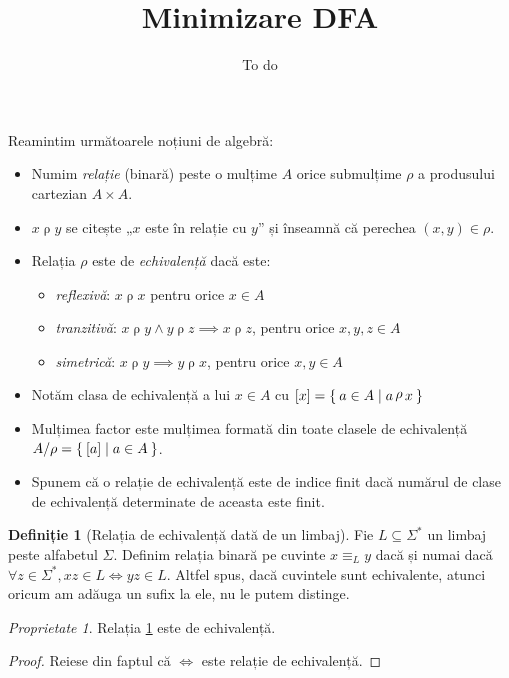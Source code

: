 \documentclass[a4paper, 12pt]{article}
\title{Minimizare DFA}
\author{To do}
\date{}
\theoremstyle{definition}
\newtheorem{definition}{Definiție}
\theoremstyle{remark}
\newtheorem*{property}{Proprietate}
\DeclareMathOperator{\rhoequiv}{\rho}
\newcommand{\wordequiv}{\operatorname{\equiv}_{L}}
\begin{document}
\maketitle

Reamintim următoarele noțiuni de algebră:
\begin{itemize}
    \item Numim \emph{relație} (binară) peste o mulțime \(A\) orice submulțime \(\rho\) a produsului cartezian \(A \times A\).
    \item \(x \rhoequiv y\) se citește „\(x\) este în relație cu \(y\)” și înseamnă că perechea \((x, y) \in \rho\).
    \item Relația \(\rho\) este de \emph{echivalență} dacă este:
    \begin{itemize}
        \item \emph{reflexivă}: \(x \rhoequiv x\) pentru orice \(x \in A\)
        \item \emph{tranzitivă}: \(x \rhoequiv y \land y \rhoequiv z \implies x \rhoequiv z\), pentru orice \(x, y, z \in A\)
        \item \emph{simetrică}: \(x \rhoequiv y \implies y \rhoequiv x\), pentru orice \(x, y \in A\)
    \end{itemize}
    \item Notăm clasa de echivalență a lui \(x \in A\) cu \([x] = \Set{ a \in A | a \rhoequiv x}\)
    \item Mulțimea factor este mulțimea formată din toate clasele de echivalență  \(A / \rho = \Set{ [a] | a \in A }\).
    \item Spunem că o relație de echivalență este de indice finit dacă numărul de clase de echivalență determinate de aceasta este finit.
\end{itemize}

\begin{definition}[Relația de echivalență dată de un limbaj]\label{wordequiv}
Fie \(L \subseteq \Sigma^*\) un limbaj peste alfabetul \(\Sigma\). Definim relația binară pe cuvinte \(x \wordequiv y\) dacă și numai dacă \(\forall z \in \Sigma^*, xz \in L \iff yz \in L\).
Altfel spus, dacă cuvintele sunt echivalente, atunci oricum am adăuga un sufix la ele, nu le putem distinge.
\end{definition}

\begin{property}
Relația \ref{wordequiv} este de echivalență.
\end{property}
\begin{proof}
Reiese din faptul că \(\iff\) este relație de echivalență.
\end{proof}
\end{document}
